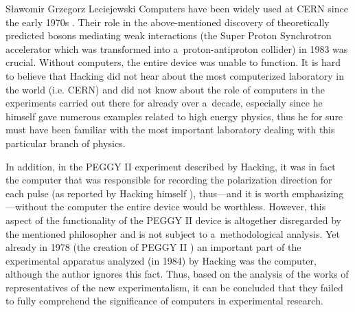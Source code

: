 \begin{artengenv}{Sławomir Grzegorz Leciejewski}
Computers have been widely used at CERN since the early 1970s 
\parencite[][]{crowley-milling_computer_1974}. %
 Their role in the above-mentioned discovery of theoretically predicted bosons mediating weak interactions (the Super Proton Synchrotron accelerator which was transformed into a~proton-antiproton collider) in 1983 was crucial. Without computers, the entire device was unable to function. It is hard to believe that Hacking did not hear about the most computerized laboratory in the world (i.e. CERN) and did not know about the role of computers in the experiments carried out there for already over a~decade, especially since he himself gave numerous examples related to high energy physics, thus he for sure must have been familiar with the most important laboratory dealing with this particular branch of physics.



In addition, in the PEGGY II experiment described by Hacking, it was in fact the computer that was responsible for recording the polarization direction for each pulse (as reported by Hacking himself 
\parencite[][p.164]{leplin_experimentation_1984}%
), thus---and it is worth emphasizing---without the computer the entire device would be worthless. However, this aspect of the functionality of the PEGGY II device is altogether disregarded by the mentioned philosopher and is not subject to a~methodological analysis. Yet already in 1978 (the creation of PEGGY II 
\parencite[][p.162]{leplin_experimentation_1984}%
) an important part of the experimental apparatus analyzed (in 1984) by Hacking was the computer, although the author ignores this fact. Thus, based on the analysis of the works of representatives of the new experimentalism, it can be concluded that they failed to fully comprehend the significance of computers in experimental research.




\end{artengenv}
